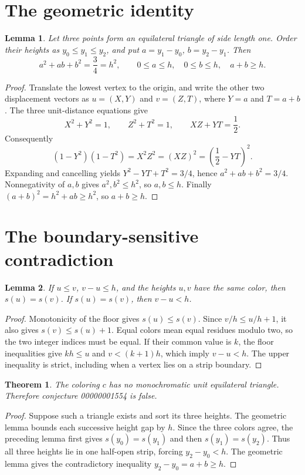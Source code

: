 \documentclass[10pt]{article}
\newtheorem{theorem}{Theorem}
\newtheorem{lemma}{Lemma}
\begin{document}
\section{The geometric identity}
\begin{lemma}
Let three points form an equilateral triangle of side length one. Order their heights as $y_0\le y_1\le y_2$, and put $a=y_1-y_0$, $b=y_2-y_1$. Then
\[
 a^2+ab+b^2=\frac34=h^2,
 \qquad 0\le a\le h,\quad 0\le b\le h,\quad a+b\ge h.
\]
\end{lemma}
\begin{proof}
Translate the lowest vertex to the origin, and write the other two displacement vectors as $u=(X,Y)$ and $v=(Z,T)$, where $Y=a$ and $T=a+b$. The three unit-distance equations give
\[
 X^2+Y^2=1,\qquad Z^2+T^2=1,
 \qquad XZ+YT=\frac12.
\]
Consequently
\[
 (1-Y^2)(1-T^2)=X^2Z^2=(XZ)^2
   =\left(\frac12-YT\right)^2.
\]
Expanding and cancelling yields $Y^2-YT+T^2=3/4$, hence
$a^2+ab+b^2=3/4$. Nonnegativity of $a,b$ gives $a^2,b^2\le h^2$, so $a,b\le h$. Finally $(a+b)^2=h^2+ab\ge h^2$, so $a+b\ge h$.
\end{proof}

\section{The boundary-sensitive contradiction}
\begin{lemma}
If $u\le v$, $v-u\le h$, and the heights $u,v$ have the same color, then $s(u)=s(v)$. If $s(u)=s(v)$, then $v-u<h$.
\end{lemma}
\begin{proof}
Monotonicity of the floor gives $s(u)\le s(v)$. Since $v/h\le u/h+1$, it also gives $s(v)\le s(u)+1$. Equal colors mean equal residues modulo two, so the two integer indices must be equal. If their common value is $k$, the floor inequalities give $kh\le u$ and $v<(k+1)h$, which imply $v-u<h$. The upper inequality is strict, including when a vertex lies on a strip boundary.
\end{proof}

\begin{theorem}
The coloring $c$ has no monochromatic unit equilateral triangle. Therefore conjecture 00000001554 is false.
\end{theorem}
\begin{proof}
Suppose such a triangle exists and sort its three heights. The geometric lemma bounds each successive height gap by $h$. Since the three colors agree, the preceding lemma first gives $s(y_0)=s(y_1)$ and then $s(y_1)=s(y_2)$. Thus all three heights lie in one half-open strip, forcing $y_2-y_0<h$. The geometric lemma gives the contradictory inequality $y_2-y_0=a+b\ge h$.
\end{proof}
\end{document}
